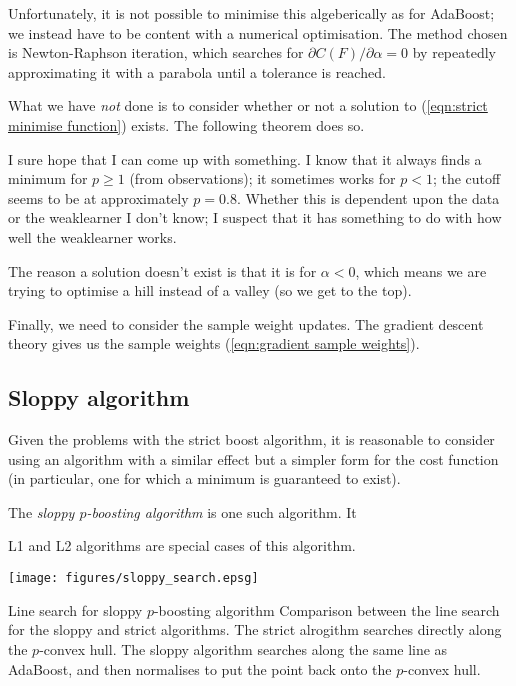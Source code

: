 Unfortunately, it is not possible to minimise this algeberically as
for AdaBoost; we instead have to be content with a numerical
optimisation.  The method chosen is Newton-Raphson iteration, which
searches for $\partial C(F) / \partial \alpha = 0$ by repeatedly
approximating it with a parabola until a tolerance is reached.

What we have \emph{not} done is to consider whether or not a solution
to (\ref{eqn:strict minimise function}) exists.  The following theorem
does so.

\begin{theorem}
I sure hope that I can come up with something.  I know that it always
finds a minimum for $p \geq 1$ (from observations); it sometimes works
for $p < 1$; the cutoff seems to be at approximately $p = 0.8$.
Whether this is dependent upon the data or the weaklearner I don't
know; I suspect that it has something to do with how well the
weaklearner works.

The reason a solution doesn't exist is that it is for $\alpha < 0$,
which means we are trying to optimise a hill instead of a valley (so
we get to the top).
\end{theorem}

Finally, we need to consider the sample weight updates.  The gradient
descent theory gives us the sample weights (\ref{eqn:gradient sample
weights}).

\subsection{Sloppy algorithm}

Given the problems with the strict boost algorithm, it is reasonable
to consider using an algorithm with a similar effect but a simpler
form for the cost function (in particular, one for which a minimum is
guaranteed to exist).

The \emph{sloppy $p$-boosting algorithm} is one such algorithm.  It 

L1 and L2 algorithms are special cases of this algorithm.

\begin{linefigure}
\begin{center}
\texttt{[image: figures/sloppy\_search.epsg]}
\end{center}
\begin{capt}{Line search for sloppy $p$-boosting algorithm}
Comparison between the line search for the sloppy and strict
algorithms.  The strict alrogithm searches directly along the
$p$-convex hull.  The sloppy algorithm searches along the same line as
AdaBoost, and then normalises to put the point back onto the
$p$-convex hull.
\end{capt}
\label{fig:strict line search}
\end{linefigure}


